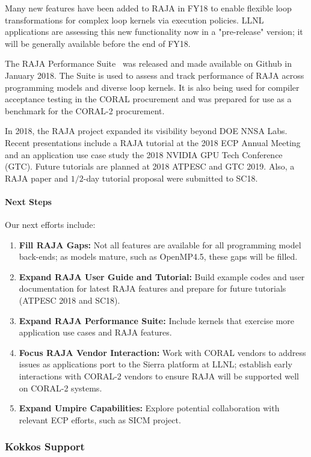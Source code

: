 Many new features have been added to RAJA in FY18 to enable flexible
loop transformations for complex loop kernels via execution policies.
LLNL applications are assessing this new functionality now in a 
"pre-release" version; it will be generally available before the end of FY18.

The RAJA Performance Suite~\cite{RAJAPerf-github} was released and made 
available on Github in January 2018. The Suite is used to assess and track 
performance of RAJA across programming models and diverse loop 
kernels. It is also being used for compiler acceptance testing in the CORAL 
procurement and was prepared for use as a benchmark for the CORAL-2 procurement.

In 2018, the RAJA project expanded its visibility beyond DOE NNSA Labs. 
Recent presentations include a RAJA tutorial at the 2018 ECP Annual Meeting 
and an application use case study the 2018 NVIDIA GPU Tech Conference (GTC). 
Future tutorials are planned at 2018 ATPESC and GTC 2019. Also, a RAJA paper 
and $1/2$-day tutorial proposal were submitted to SC18.

\paragraph{Next Steps}

Our next efforts include:
\begin{enumerate}
\item {\bf Fill RAJA Gaps:} Not all features are available for all programming
  model back-ends; as models mature, such as OpenMP4.5, these gaps will be
    filled.
\item {\bf Expand RAJA User Guide and Tutorial:} Build example codes and user
  documentation for latest RAJA features and prepare for future tutorials
    (ATPESC 2018 and SC18).
\item {\bf Expand RAJA Performance Suite:} Include kernels that exercise more
  application use cases and RAJA features.
\item {\bf Focus RAJA Vendor Interaction:} Work with CORAL vendors to address
  issues as applications port to the Sierra platform at LLNL; establish early
    interactions with CORAL-2 vendors to ensure RAJA will be supported well on
    CORAL-2 systems.
\item {\bf Expand Umpire Capabilities:} Explore potential collaboration with
  relevant ECP efforts, such as SICM project.
\end{enumerate}
\subsubsection{ Kokkos Support} 

